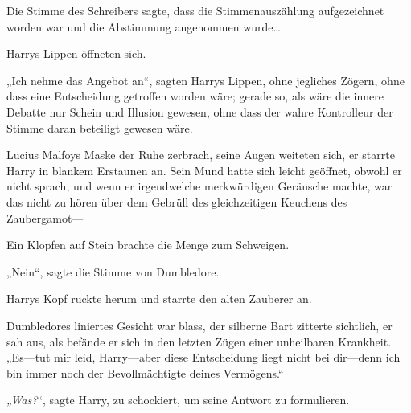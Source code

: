 Die Stimme des Schreibers sagte, dass die Stimmenauszählung aufgezeichnet worden war und die Abstimmung angenommen wurde…

Harrys Lippen öffneten sich.

„Ich nehme das Angebot an“, sagten Harrys Lippen, ohne jegliches Zögern, ohne dass eine Entscheidung getroffen worden wäre; gerade so, als wäre die innere Debatte nur Schein und Illusion gewesen, ohne dass der wahre Kontrolleur der Stimme daran beteiligt gewesen wäre.

Lucius Malfoys Maske der Ruhe zerbrach, seine Augen weiteten sich, er starrte Harry in blankem Erstaunen an. Sein Mund hatte sich leicht geöffnet, obwohl er nicht sprach, und wenn er irgendwelche merkwürdigen Geräusche machte, war das nicht zu hören über dem Gebrüll des gleichzeitigen Keuchens des Zaubergamot—

Ein Klopfen auf Stein brachte die Menge zum Schweigen.

„Nein“, sagte die Stimme von Dumbledore.

Harrys Kopf ruckte herum und starrte den alten Zauberer an.

Dumbledores liniertes Gesicht war blass, der silberne Bart zitterte sichtlich, er sah aus, als befände er sich in den letzten Zügen einer unheilbaren Krankheit.
„Es—tut mir leid, Harry—aber diese Entscheidung liegt nicht bei dir—denn ich bin immer noch der Bevollmächtigte deines Vermögens.“

\emph{„Was?}“, sagte Harry, zu schockiert, um seine Antwort zu formulieren.

